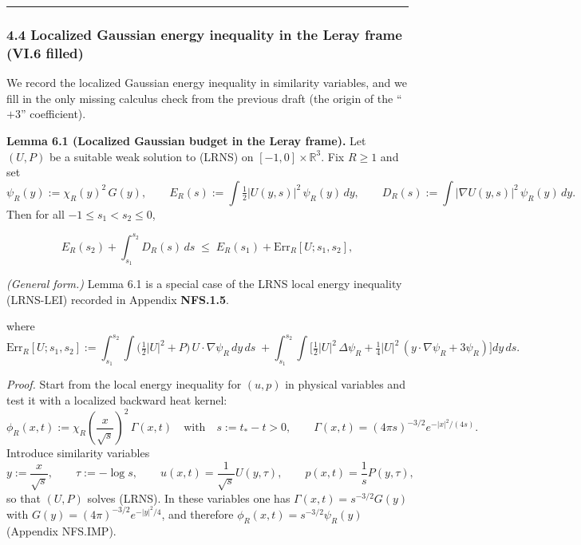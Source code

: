 \documentclass[
  11pt,
]{article}
\begin{document}
\begin{center}\rule{0.5\linewidth}{0.5pt}\end{center}

\hypertarget{localized-gaussian-energy-inequality-in-the-leray-frame-vi.6-filled}{%
\subsubsection{4.4 Localized Gaussian energy inequality in the Leray frame (VI.6 filled)}\label{localized-gaussian-energy-inequality-in-the-leray-frame-vi.6-filled}}

We record the localized Gaussian energy inequality in similarity variables, and we fill in the only missing calculus check from the previous draft (the origin of the ``\(+3\)'' coefficient).

\textbf{Lemma 6.1 (Localized Gaussian budget in the Leray frame).} Let \((U,P)\) be a suitable weak solution to (LRNS) on \([-1,0]\times\mathbb R^3\). Fix \(R\ge1\) and set \[
\psi_R(y) := \chi_R(y)^2\,G(y),
\qquad
E_R(s):=\int \tfrac12 |U(y,s)|^2\,\psi_R(y)\,dy,
\qquad
D_R(s):=\int |\nabla U(y,s)|^2\,\psi_R(y)\,dy.
\] Then for all \(-1\le s_1<s_2\le0\),

\begin{equation}
E_R(s_2)+\int_{s_1}^{s_2} D_R(s)\,ds
\;\le\;
E_R(s_1)+\mathrm{Err}_R[U; s_1,s_2],
\tag{6.2}\label{6.2}
\end{equation}

\emph{(General form.)} Lemma 6.1 is a special case of the LRNS local energy inequality (LRNS-LEI) recorded in Appendix \textbf{NFS.1.5}.

where \[
\mathrm{Err}_R[U; s_1,s_2]
:=
\int_{s_1}^{s_2}\!\int \Big(\tfrac12|U|^2+P\Big)\,U\cdot\nabla\psi_R\,dy\,ds
\;+
\int_{s_1}^{s_2}\!\int \Big[
\tfrac12|U|^2\,\Delta\psi_R
+\tfrac14|U|^2\,(y\cdot\nabla\psi_R+3\psi_R)
\Big]dy\,ds.
\]

\emph{Proof.} Start from the local energy inequality for \((u,p)\) in physical variables and test it with a localized backward heat kernel: \[
\phi_{R}(x,t):=\chi_R\!\left(\frac{x}{\sqrt{s}}\right)^{\!2}\,\Gamma(x,t)
\quad\text{with}\quad
s:=t_\ast-t>0,
\qquad
\Gamma(x,t)=(4\pi s)^{-3/2}e^{-|x|^2/(4s)}.
\] Introduce similarity variables \[
y:=\frac{x}{\sqrt{s}},\qquad \tau:=-\log s,
\qquad
u(x,t)=\frac{1}{\sqrt{s}}U(y,\tau),
\qquad
p(x,t)=\frac{1}{s}P(y,\tau),
\] so that \((U,P)\) solves (LRNS). In these variables one has \(\Gamma(x,t)=s^{-3/2}G(y)\) with \(G(y)=(4\pi)^{-3/2}e^{-|y|^2/4}\), and therefore \(\phi_R(x,t)=s^{-3/2}\psi_R(y)\) (Appendix NFS.IMP).
\end{document}
